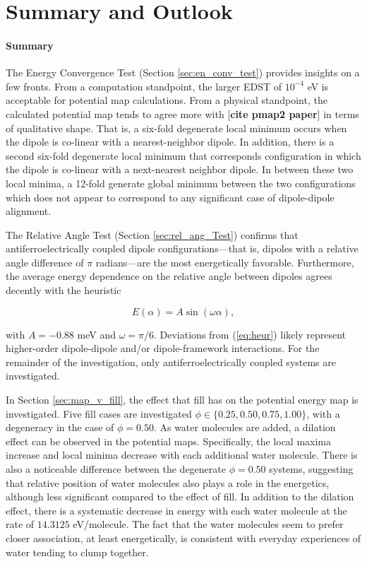     \section{Summary and Outlook}
    
    \paragraph{Summary} The Energy Convergence Test (Section \ref{sec:en_conv_test}) provides insights on a few fronts. From a computation standpoint, the larger EDST of $10^{-4}$ eV is acceptable for potential map calculations. From a physical standpoint, the calculated potential map tends to agree more with [\textbf{cite pmap2 paper}] in terms of qualitative shape. That is, a six-fold degenerate local minimum occurs when the dipole is co-linear with a nearest-neighbor dipole. In addition, there is a second six-fold degenerate local minimum that corresponds configuration in which the dipole is co-linear with a next-nearest neighbor dipole. In between these two local minima, a 12-fold generate global minimum between the two configurations which does not appear to correspond to any significant case of dipole-dipole alignment.
    
    The Relative Angle Test (Section \ref{sec:rel_ang_Test}) confirms that antiferroelectrically coupled dipole configurations---that is, dipoles with a relative angle difference of $\pi$ radians---are the most energetically favorable. Furthermore, the average energy dependence on the relative angle between dipoles agrees decently with the heuristic
    
    \begin{equation}
    \label{eq:heur}
        E(\alpha) = A \sin(\omega \alpha),
    \end{equation}
    
    \noindent with $A=-0.88$ meV and $\omega = \pi/6$. Deviations from (\ref{eq:heur}) likely represent higher-order dipole-dipole and/or dipole-framework interactions. For the remainder of the investigation, only antiferroelectrically coupled systems are investigated.
    
    In Section \ref{sec:map_v_fill}, the effect that fill has on the potential energy map is investigated. Five fill cases are investigated $\phi \in \{0.25,0.50,0.75,1.00\}$, with a degeneracy in the case of $\phi = 0.50$. As water molecules are added, a dilation effect can be observed in the potential maps. Specifically, the local maxima increase and local minima decrease with each additional water molecule. There is also a noticeable difference between the degenerate $\phi=0.50$ systems, suggesting that relative position of water molecules also plays a role in the energetics, although less significant compared to the effect of fill. In addition to the dilation effect, there is a systematic decrease in energy with each water molecule at the rate of $14.3125$ eV/molecule. The fact that the water molecules seem to prefer closer association, at least energetically, is consistent with everyday experiences of water tending to clump together. 
    
